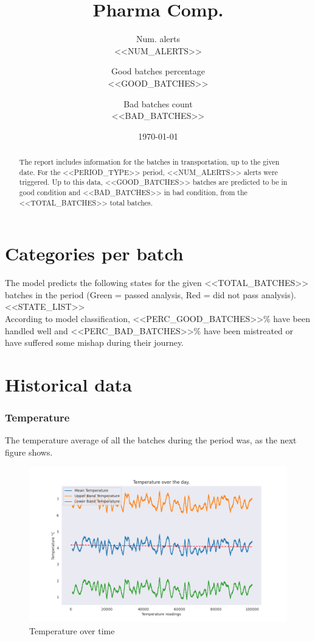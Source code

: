 \documentclass[daily]{engenius}
\title{Pharma Comp.}
\author{Num. alerts \\ {<<NUM_ALERTS>>}
	\and Good batches percentage \\ {<<GOOD_BATCHES>>}
    \and Bad batches count \\ {<<BAD_BATCHES>>}
    }
\date{\today}
\begin{document}
\maketitle

\begin{abstract}

The report includes information for the batches in transportation, up to the given date. For the {<<PERIOD_TYPE>>} period, {<<NUM_ALERTS>>} alerts were triggered. Up to this data, {<<GOOD_BATCHES>>} batches are predicted to be in good condition and {<<BAD_BATCHES>>} in bad condition, from the {<<TOTAL_BATCHES>>} total batches.

\end{abstract}


\section{Categories per batch}
The model predicts the following states for the given {<<TOTAL_BATCHES>>} batches in the period (Green = passed analysis, Red = did not pass analysis). \\
{<<STATE_LIST>>} \\
According to model classification, {<<PERC_GOOD_BATCHES>>}\% have been handled well and {<<PERC_BAD_BATCHES>>}\% have been mistreated or have suffered some mishap during their journey.


\section{Historical data}
\subsubsection{Temperature}

The temperature average of all the batches during the period was, as the next figure shows.

\begin{figure}[H]
    \begin{center}
        \includegraphics[width=\textwidth/2]{./temp/temperature_plot.png}
        \caption{Temperature over time}
    \end{center}
\end{figure}
\end{document}
